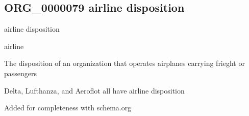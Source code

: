 \documentclass[letterpaper,10pt,english]{sphinxmanual}
\begin{document}
\subsection{ORG\_0000079 \sphinxhyphen{} airline disposition}
\label{\detokenize{doc-ORG_0000079:org-0000079-airline-disposition}}\label{\detokenize{doc-ORG_0000079:index-0}}\label{\detokenize{doc-ORG_0000079::doc}}
\begin{sphinxShadowBox}

\sphinxAtStartPar
airline disposition
\end{sphinxShadowBox}

\begin{sphinxShadowBox}

\sphinxAtStartPar
airline
\end{sphinxShadowBox}

\begin{sphinxShadowBox}

\sphinxAtStartPar
{\hyperref[\detokenize{doc-BFO_0000016::doc}]{}}
\end{sphinxShadowBox}

\begin{sphinxShadowBox}

\sphinxAtStartPar
The disposition of an organization that operates airplanes carrying frieght or passengers
\end{sphinxShadowBox}

\begin{sphinxShadowBox}

\sphinxAtStartPar
{}
\end{sphinxShadowBox}

\begin{sphinxShadowBox}

\sphinxAtStartPar
Delta, Lufthanza, and Aeroflot all have airline disposition
\end{sphinxShadowBox}

\begin{sphinxShadowBox}

\sphinxAtStartPar
Added for completeness with schema.org
\end{sphinxShadowBox}
\end{document}
